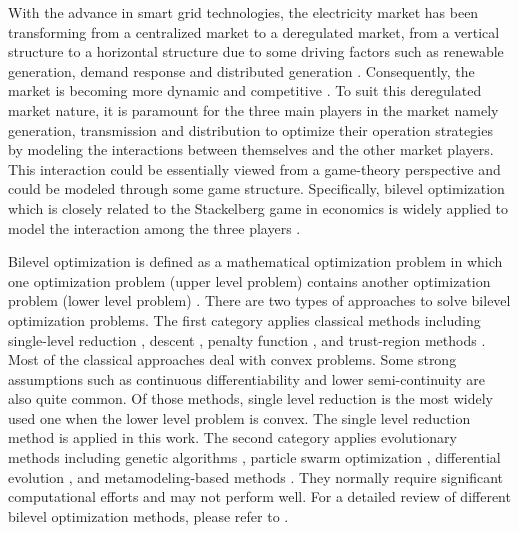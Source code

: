 With the advance in smart grid technologies, the electricity market has been transforming from a centralized market to a deregulated market, from a vertical structure to a horizontal structure due to some driving factors such as renewable generation, demand response and distributed generation \cite{nesamalar2016energy}. Consequently, the market is becoming more dynamic and competitive \cite{sun2017identifying}. To suit this deregulated market nature, it is paramount for the three main players in the market namely generation, transmission and distribution to optimize their operation strategies by modeling the interactions between themselves and the other market players. This interaction could be essentially viewed from a game-theory perspective and could be modeled through some game structure. Specifically, bilevel optimization which is closely related to the Stackelberg game in economics is widely applied to model the interaction among the three players \cite{colson2007overview}. 

Bilevel optimization is defined as a mathematical optimization problem in which one optimization problem (upper level problem) contains another optimization problem (lower level problem) \cite{bilevel1}. There are two types of approaches to solve bilevel optimization problems. The first category applies classical methods including single-level reduction \cite{bialas1984two,bard1982explicit}, descent \cite{kolstad1990derivative,savard1994steepest}, penalty function \cite{lv2007penalty,white1993penalty}, and trust-region methods \cite{colson2005trust,marcotte2001trust}. Most of the classical approaches deal with convex problems. Some strong assumptions such as continuous differentiability and lower semi-continuity are also quite common. Of those methods, single level reduction is the most widely used one when the lower level problem is convex. The single level reduction method is applied in this work. The second category applies evolutionary methods including genetic algorithms \cite{mathieu1994genetic}, particle swarm optimization \cite{li2006hierarchical}, differential evolution \cite{zhu2006hybrid}, and metamodeling-based methods \cite{wang2007review}. They normally require significant computational efforts and may not perform well. For a detailed review of different bilevel optimization methods, please refer to \cite{bilevel1, bilevel2}. 

